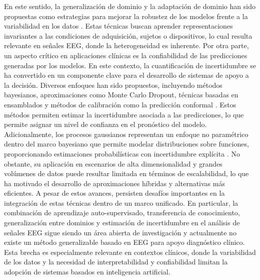 En este sentido, la generalización de dominio y la adaptación de dominio han sido propuestas como estrategias para mejorar la robustez de los modelos frente a la variabilidad en los datos \cite{Wang2022DG}. Estas técnicas buscan aprender representaciones invariantes a las condiciones de adquisición, sujetos o dispositivos, lo cual resulta relevante en señales EEG, donde la heterogeneidad es inherente.
Por otra parte, un aspecto crítico en aplicaciones clínicas es la confiabilidad de las predicciones generadas por los modelos. En este contexto, la cuantificación de incertidumbre se ha convertido en un componente clave para el desarrollo de sistemas de apoyo a la decisión. Diversos enfoques han sido propuestos, incluyendo métodos bayesianos, aproximaciones como Monte Carlo Dropout, técnicas basadas en ensamblados y métodos de calibración como la predicción conformal \cite{Loftus2022,ovadia2019trustmodelsuncertaintyevaluating}. Estos métodos permiten estimar la incertidumbre asociada a las predicciones, lo que permite asignar un nivel de confianza en el pronóstico del modelo.
Adicionalmente, los procesos gaussianos representan un enfoque no paramétrico dentro del marco bayesiano que permite modelar distribuciones sobre funciones, proporcionando estimaciones probabilísticas con incertidumbre explícita \cite{Rasmussen2006}. No obstante, su aplicación en escenarios de alta dimensionalidad y grandes volúmenes de datos puede resultar limitada en términos de escalabilidad, lo que ha motivado el desarrollo de aproximaciones híbridas y alternativas más eficientes.
A pesar de estos avances, persisten desafíos importantes en la integración de estas técnicas dentro de un marco unificado. En particular, la combinación de aprendizaje auto-supervisado, transferencia de conocimiento, generalización entre dominios y estimación de incertidumbre en el análisis de señales EEG sigue siendo un área abierta de investigación \cite{ABDAR2021243} y actualmente no existe un método generalizable basado en EEG para apoyo diagnóstico clínico. Esta brecha es especialmente relevante en contextos clínicos, donde la variabilidad de los datos y la necesidad de interpretabilidad y confiabilidad limitan la adopción de sistemas basados en inteligencia artificial.